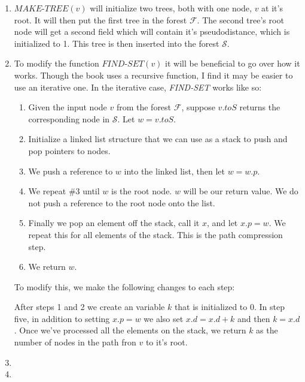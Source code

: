 \documentclass[letterpaper,10pt]{article}
\begin{document}
\begin{enumerate}
\begin{enumerate}
    \item $\textit{MAKE-TREE}(v)$ will initialize two trees, both with one node, $v$ at it's root. It will then put the first tree in the forest $\mathcal{F}$. The second tree's root node will get a second field which will contain it's pseudodistance, which is initialized to 1. This tree is then inserted into the forest $\mathcal{S}$.
    \item To modify the function $\textit{FIND-SET}(v)$ it will be beneficial to go over how it works. Though the book uses a recursive function, I find it may be easier to use an iterative one. In the iterative case, \textit{FIND-SET} works like so:
    \begin{enumerate}[1.]
      \item Given the input node $v$ from the forest $\mathcal{F}$, suppose $v.toS$ returns the corresponding node in $\mathcal{S}$. Let $w = v.toS$. 
      \item Initialize a linked list structure that we can use as a stack to push and pop pointers to nodes. 
      \item We push a reference to $w$ into the linked list, then let $w = w.p$.
      \item We repeat \#3 until $w$ is the root node. $w$ will be our return value. We do not push a reference to the root node onto the list.
      \item Finally we pop an element off the stack, call it $x$, and let $x.p = w$. We repeat this for all elements of the stack. This is the path compression step.
      \item We return $w$.
    \end{enumerate}
    To modify this, we make the following changes to each step:

    After steps 1 and 2 we create an variable $k$ that is initialized to 0.  In step five, in addition to setting $x.p = w$ we also set $x.d = x.d + k$ and then $k = x.d$. Once we've processed all the elements on the stack, we return $k$ as the number of nodes in the path fron $v$ to it's root.
    \item 
    \item 
  \end{enumerate}
\end{enumerate}
\end{document}
